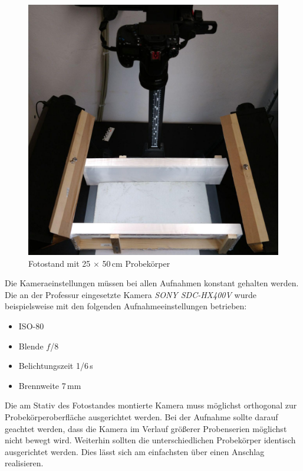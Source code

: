 \documentclass{article}
\begin{document}
\begin{figure}[htbp]
	\centering
	\includegraphics[height=0.4\textheight]{pictures/Fotostand.jpg}
	\caption{Fotostand mit 25 $\times$ 50\,cm Probekörper}
	\label{pic:fotostand}
\end{figure}

Die Kameraeinstellungen müssen bei allen Aufnahmen konstant gehalten werden. Die an der Professur eingesetzte Kamera \textit{SONY SDC-HX400V} wurde beispielsweise mit den folgenden Aufnahmeeinstellungen betrieben:

\begin{itemize} 
	\item ISO-80 
	\item Blende $f$/8 
	\item Belichtungszeit 1/6\,s
	\item Brennweite 7\,mm
\end{itemize}


Die am Stativ des Fotostandes montierte Kamera muss möglichst orthogonal zur Probekörperoberfläche ausgerichtet werden. Bei der Aufnahme sollte darauf geachtet werden, dass die Kamera im Verlauf größerer Probenserien möglichst nicht bewegt wird. Weiterhin sollten die unterschiedlichen Probekörper identisch ausgerichtet werden. Dies lässt sich am einfachsten über einen Anschlag realisieren.
\end{document}

